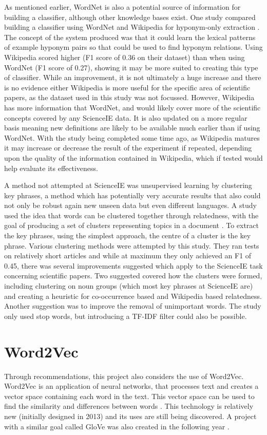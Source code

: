 As mentioned earlier, WordNet is also a potential source of information for building a classifier, although other knowledge bases exist. One study compared building a classifier using WordNet and Wikipedia for hyponym-only extraction \cite{Snow2004}. The concept of the system produced was that it could learn the lexical patterns of example hyponym pairs so that could be used to find hyponym relations. Using Wikipedia scored higher (F1 score of 0.36 on their dataset) than when using WordNet (F1 score of 0.27), showing it may be more suited to creating this type of classifier. While an improvement, it is not ultimately a huge increase and there is no evidence either Wikipedia is more useful for the specific area of scientific papers, as the dataset used in this study was not focussed. However, Wikipedia has more information that WordNet, and would likely cover more of the scientific concepts covered by any ScienceIE data. It is also updated on a more regular basis meaning new definitions are likely to be available much earlier than if using WordNet. With the study being completed some time ago, as Wikipedia matures it may increase or decrease the result of the experiment if repeated, depending upon the quality of the information contained in Wikipedia, which if tested would help evaluate its effectiveness.

A method not attempted at ScienceIE was unsupervised learning by clustering key phrases, a method which has potentially very accurate results that also could not only be robust again new unseen data but even different languages. A study used the idea that words can be clustered together through relatedness, with the goal of producing a set of clusters representing topics in a document \cite{Liu2009}. To extract the key phrases, using the simplest approach, the centre of a cluster is the key phrase. Various clustering methods were attempted by this study. They ran tests on relatively short articles and while at maximum they only achieved an F1 of 0.45, there was several improvements suggested which apply to the ScienceIE task concerning scientific papers. Two suggested covered how the clusters were formed, including clustering on noun groups (which most key phrases at ScienceIE are) and creating a heuristic for co-occurrence based and Wikipedia based relatedness. Another suggestion was to improve the removal of unimportant words. The study only used stop words, but introducing a TF-IDF filter could also be possible.

\section{Word2Vec}
Through recommendations, this project also considers the use of Word2Vec. Word2Vec is an application of neural networks, that processes text and creates a vector space containing each word in the text. This vector space can be used to find the similarity and differences between words \cite{Mikolov2013}. This technology is relatively new (initially designed in 2013) and its uses are still being discovered. A project with a similar goal called GloVe was also created in the following year \cite{Pennington2014}.

